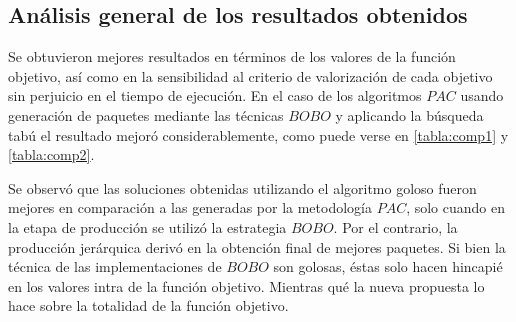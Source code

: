 \begin{table}[H]
\begin{center}
\caption{Comparación de calidad de soluciones entre algoritmos para la \hyperref[busqueda:atracciones]{búsqueda de atracciones turísticas}}
\end{center}
\end{table}

\subsection{Análisis general de los resultados obtenidos}
Se obtuvieron mejores resultados en términos de los valores de la función objetivo, así como en la sensibilidad al criterio de valorización de cada objetivo sin perjuicio en el tiempo de ejecución. En el caso de los algoritmos $PAC$ usando generación de paquetes mediante las técnicas $BOBO$ y aplicando la búsqueda tabú el resultado mejoró considerablemente, como puede verse en \autoref{tabla:comp1} y \autoref{tabla:comp2}.

Se observó que las soluciones obtenidas utilizando el algoritmo goloso fueron mejores en comparación a las generadas por la metodología $PAC$, solo cuando en la etapa de producción se utilizó la estrategia $BOBO$. Por el contrario, la producción jerárquica derivó en la obtención final de mejores paquetes. Si bien la técnica de las implementaciones de $BOBO$ son golosas, éstas solo hacen hincapié en los valores intra de la función objetivo. Mientras qué la nueva propuesta lo hace sobre la totalidad de la función objetivo. 


